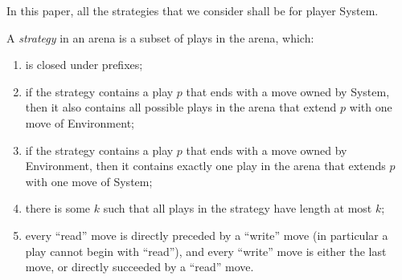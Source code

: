 \documentclass[a4paper,UKenglish,cleveref, autoref, numberwithinsect, thm-restate]{lipics-v2021}
\begin{document}
In this paper, all the strategies that we consider shall be for player System.
\begin{definition}
    A \emph{strategy}  in an arena  is a subset of plays in the arena, which: 
    \begin{enumerate}
        \item is closed under prefixes;
        \item\label{item:sys-ext} if the strategy contains a play $p$ that ends with a move owned by System, then it also contains all possible plays  in the arena that extend $p$ with one move of Environment;
        \item\label{item:env-ext} if the strategy contains a play $p$ that ends with a move owned by Environment, then it contains exactly one play  in the arena that extends $p$ with one move of System;
         \item there is some $k$ such that all plays in the strategy have length at most $k$;
        \item every ``read'' move is directly preceded by a ``write'' move (in particular a play cannot begin with ``read''), and every ``write'' move is either the last move, or directly succeeded by a ``read'' move.
    \end{enumerate}
\end{definition}
\end{document}
